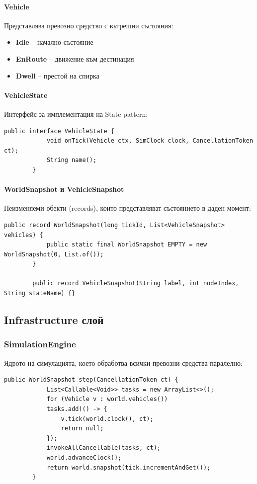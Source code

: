 \documentclass{article}
\begin{document}
	\paragraph{Vehicle}
	Представлява превозно средство с вътрешни състояния:
	
	\begin{itemize}
		\item \textbf{Idle} – начално състояние
		\item \textbf{EnRoute} – движение към дестинация
		\item \textbf{Dwell} – престой на спирка
	\end{itemize}
	
	\paragraph{VehicleState}
	Интерфейс за имплементация на State pattern:
	
	\begin{lstlisting}[caption=Интерфейс VehicleState]
		public interface VehicleState {
			void onTick(Vehicle ctx, SimClock clock, CancellationToken ct);
			String name();
		}
	\end{lstlisting}
	
	\paragraph{WorldSnapshot и VehicleSnapshot}
	Неизменяеми обекти (records), които представляват състоянието в даден момент:
	
	\begin{lstlisting}[caption=Snapshot класове]
		public record WorldSnapshot(long tickId, List<VehicleSnapshot> vehicles) {
			public static final WorldSnapshot EMPTY = new WorldSnapshot(0, List.of());
		}
		
		public record VehicleSnapshot(String label, int nodeIndex, String stateName) {}
	\end{lstlisting}
	
	\subsection{Infrastructure слой}
	
	\subsubsection{SimulationEngine}
	
	Ядрото на симулацията, което обработва всички превозни средства паралелно:
	\vspace{-1mm}
	\begin{lstlisting}[caption=Ключов метод на SimulationEngine]
		public WorldSnapshot step(CancellationToken ct) {
			List<Callable<Void>> tasks = new ArrayList<>();
			for (Vehicle v : world.vehicles())
			tasks.add(() -> {
				v.tick(world.clock(), ct);
				return null;
			});
			invokeAllCancellable(tasks, ct);
			world.advanceClock();
			return world.snapshot(tick.incrementAndGet());
		}
	\end{lstlisting}
	
\end{document}
